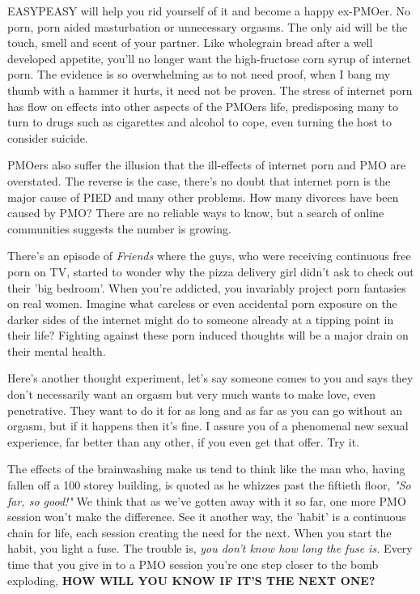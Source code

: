 \documentclass[easypeasy.tex]{subfiles}
\begin{document}
EASYPEASY will help you rid yourself of it and become a happy ex-PMOer. No porn, porn aided masturbation or unnecessary orgasms. The only aid will be the touch, smell and scent of your partner. Like wholegrain bread after a well developed appetite, you'll no longer want the high-fructose corn syrup of internet porn. The evidence is so overwhelming as to not need proof, when I bang my thumb with a hammer it hurts, it need not be proven. The stress of internet porn has flow on effects into other aspects of the PMOers life, predisposing many to turn to drugs such as cigarettes and alcohol to cope, even turning the host to consider suicide.

PMOers also suffer the illusion that the ill-effects of internet porn and PMO are overstated. The reverse is the case, there's no doubt that internet porn is the major cause of PIED and many other problems. How many divorces have been caused by PMO? There are no reliable ways to know, but a search of online communities suggests the number is growing.

There's an episode of \textit{Friends} where the guys, who were receiving continuous free porn on TV, started to wonder why the pizza delivery girl didn't ask to check out their 'big bedroom'. When you're addicted, you invariably project porn fantasies on real women. Imagine what careless or even accidental porn exposure on the darker sides of the internet might do to someone already at a tipping point in their life? Fighting against these porn induced thoughts will be a major drain on their mental health.

Here's another thought experiment, let's say someone comes to you and says they don't necessarily want an orgasm but very much wants to make love, even penetrative. They want to do it for as long and as far as you can go without an orgasm, but if it happens then it's fine. I assure you of a phenomenal new sexual experience, far better than any other, if you even get that offer. Try it.

The effects of the brainwashing make us tend to think like the man who, having fallen off a 100 storey building, is quoted as he whizzes past the fiftieth floor, \textit{"So far, so good!"} We think that as we've gotten away with it so far, one more PMO session won't make the difference. See it another way, the 'habit' is a continuous chain for life, each session creating the need for the next. When you start the habit, you light a fuse. The trouble is, \textit{you don't know how long the fuse is.} Every time that you give in to a PMO session you're one step closer to the bomb exploding, \textbf{HOW WILL YOU KNOW IF IT'S THE NEXT ONE?}
\end{document}
